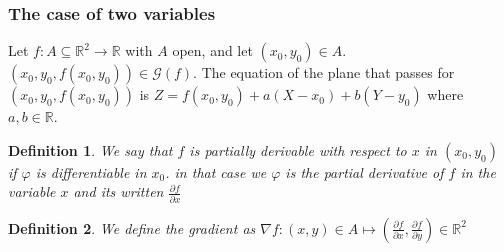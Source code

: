 \documentclass{article}
\newtheorem{definition}{Definition}
\begin{document}
    \subsubsection*{The case of two variables}
    Let $f : A \subseteq \mathbb{R}^2 \rightarrow \mathbb{R}$ with $A$ open, and let $(x_0,y_0) \in A$. \\ $(x_0,y_0, f(x_0,y_0)) \in \mathcal{G}(f)$. The equation of the plane that passes for \\ $(x_0,y_0, f(x_0,y_0))$ is $Z = f(x_0,y_0) + a(X-x_0) + b(Y-y_0)$ where $a,b \in \mathbb{R}$.
    \begin{definition}
        We say that $f$ is partially derivable with respect to $x$ in $(x_0,y_0)$ if $\varphi$ is differentiable in $x_0$.
        in that case we $\varphi$ is the partial derivative of $f$ in the variable $x$ and its written $\frac{\partial f}{\partial x}$ 
    \end{definition}
    \begin{definition}
        We define the gradient as $\nabla f : (x,y) \in A \longmapsto \left( \frac{\partial f}{\partial x},\frac{\partial f}{\partial y} \right) \in \mathbb{R}^2$
    \end{definition}
\end{document}
